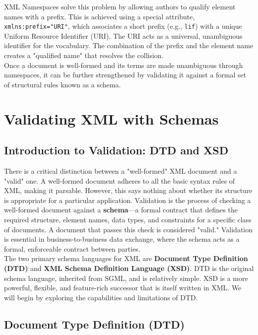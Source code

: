 \documentclass{scrbook}
\begin{document}
XML Namespaces solve this problem by allowing authors to qualify element names with a prefix. This is achieved using a special attribute, \texttt{xmlns:prefix="URI"}, which associates a short prefix (e.g., \texttt{lif}) with a unique Uniform Resource Identifier (URI). The URI acts as a universal, unambiguous identifier for the vocabulary. The combination of the prefix and the element name creates a "qualified name" that resolves the collision. \\

Once a document is well-formed and its terms are made unambiguous through namespaces, it can be further strengthened by validating it against a formal set of structural rules known as a schema.

\chapter{Validating XML with Schemas}

\section{Introduction to Validation: DTD and XSD}

There is a critical distinction between a "well-formed" XML document and a "valid" one. A well-formed document adheres to all the basic syntax rules of XML, making it parsable. However, this says nothing about whether its structure is appropriate for a particular application. Validation is the process of checking a well-formed document against a \textbf{schema}—a formal contract that defines the required structure, element names, data types, and constraints for a specific class of documents. A document that passes this check is considered "valid." Validation is essential in business-to-business data exchange, where the schema acts as a formal, enforceable contract between parties. \\

The two primary schema languages for XML are \textbf{Document Type Definition (DTD)} and \textbf{XML Schema Definition Language (XSD)}. DTD is the original schema language, inherited from SGML, and is relatively simple. XSD is a more powerful, flexible, and feature-rich successor that is itself written in XML. We will begin by exploring the capabilities and limitations of DTD.

\section{Document Type Definition (DTD)}
\end{document}
